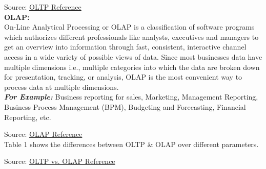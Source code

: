 \documentclass[12pt]{article}
\begin{document}
Source: \href{https://database.guide/what-is-oltp/}{OLTP Reference}\\  

\textbf{OLAP:} \\
On-Line Analytical Processing or OLAP is a classification of software programs which authorizes different professionals like analysts, executives and managers to get an overview into information through fast, consistent, interactive channel access in a wide variety of possible views of data. Since most businesses data have multiple dimensions i.e., multiple categories into which the data are broken down for presentation, tracking, or analysis, OLAP is the most convenient way to process data at multiple dimensions. \\
\textbf{\textit{For Example:}} Business reporting for sales, Marketing, Management Reporting, Business Process Management (BPM), Budgeting and Forecasting, Financial Reporting, etc.

Source: \href{https://olap.com/olap-definition/}{OLAP Reference} \\

Table 1 shows the differences between OLTP \& OLAP over different parameters.

Source: \href{https://www.guru99.com/oltp-vs-olap.html}{OLTP vs. OLAP Reference}
\end{document}
